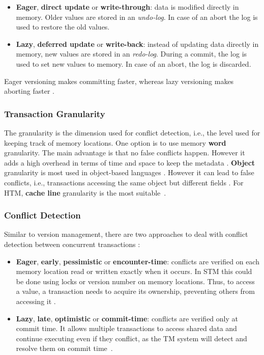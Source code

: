 \begin{itemize}
	\item \textbf{Eager}, \textbf{direct update} or \textbf{write-through}: data is modified directly in memory. Older values are stored in an \emph{undo-log}. In case of an abort the log is used to restore the old values.
	
	\item \textbf{Lazy}, \textbf{deferred update} or \textbf{write-back}: instead of updating data directly in memory, new values are stored in an \emph{redo-log}. During a commit, the log is used to set new values to memory.  In case of an abort, the log is discarded.
\end{itemize}

Eager versioning makes committing faster, whereas lazy versioning makes aborting faster \cite{Grahn:2010}.

\subsubsection{Transaction Granularity}\label{sec:granularity}

The granularity is the dimension used for conflict detection, i.e., the level used for keeping track of memory locations. One option is to use memory \textbf{word} granularity. The main advantage is that no false conflicts happen. However it adds a high overhead in terms of time and space to keep the metadata \cite{Grahn:2010}. \textbf{Object} granularity is most used in object-based languages \cite{CastroPhD:2012}. However it can lead to false conflicts, i.e., transactions accessing the same object but different fields \cite{Larus:2008}. For HTM, \textbf{cache line} granularity is the most suitable~\cite{Grahn:2010}.

\subsubsection{Conflict Detection}\label{sec:conflictDetection}
Similar to version management, there are two approaches to deal with conflict detection between concurrent transactions \cite{Grahn:2010}:

\begin{itemize}
	\item \textbf{Eager}, \textbf{early}, \textbf{pessimistic} or \textbf{encounter-time}: conflicts are verified on each memory location read or written exactly when it occurs. In STM this could be done using locks or version number on memory locations. Thus, to access a value, a transaction needs to acquire its ownership, preventing others from accessing it \cite{Bandeira:2015}.
	
	\item \textbf{Lazy}, \textbf{late}, \textbf{optimistic} or \textbf{commit-time}: conflicts are verified only at commit time. It allows multiple transactions to access shared data and continue executing even if they conflict, as the TM system will detect and resolve them on commit time~\cite[p. 20]{Harris:2010}.
	
\end{itemize}

